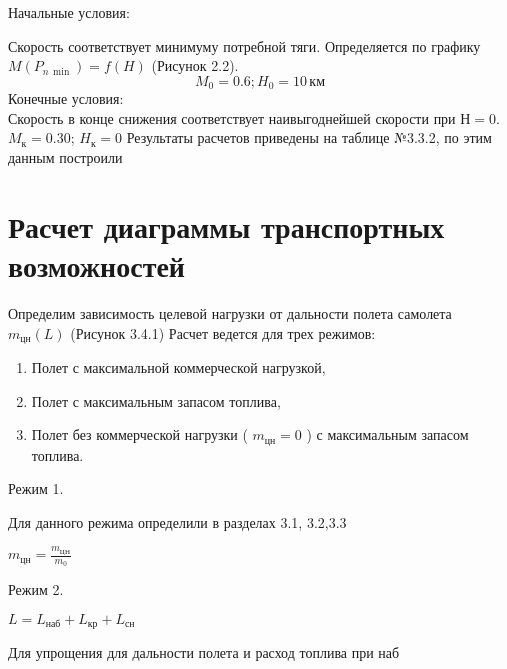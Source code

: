 Начальные условия:

Скорость соответствует минимуму потребной тяги. Определяется по графику
$M(P_{n\, \min})=f(H)$ (Рисунок 2.2).
\[
    M_0=0.6; H_0 = 10\, \text{км}
\]
Конечные условия:\\
Скорость в конце снижения соответствует наивыгоднейшей скорости при $Н=0$.
$M_к = 0.30$; $H_к = 0$
Результаты расчетов приведены на таблице №3.3.2, по этим данным построили


\section{Расчет диаграммы транспортных возможностей}
Определим зависимость целевой нагрузки от дальности полета самолета
$m_{цн}(L)$ (Рисунок 3.4.1)
Расчет ведется для трех режимов:
\begin{enumerate}
    \item Полет с максимальной коммерческой нагрузкой,
    \item Полет с максимальным запасом топлива,
    \item Полет без коммерческой нагрузки ( $m_{цн}=0$ ) с максимальным запасом топлива.
\end{enumerate}

Режим 1.

Для данного режима определили в разделах 3.1, 3.2,3.3

$m_{цн} = \frac{m_{ЦН}}{m_0}$

Режим 2.

$ L = L_{наб} + L_{кр} + L_{сн} $

Для упрощения для дальности полета и расход топлива при наб

